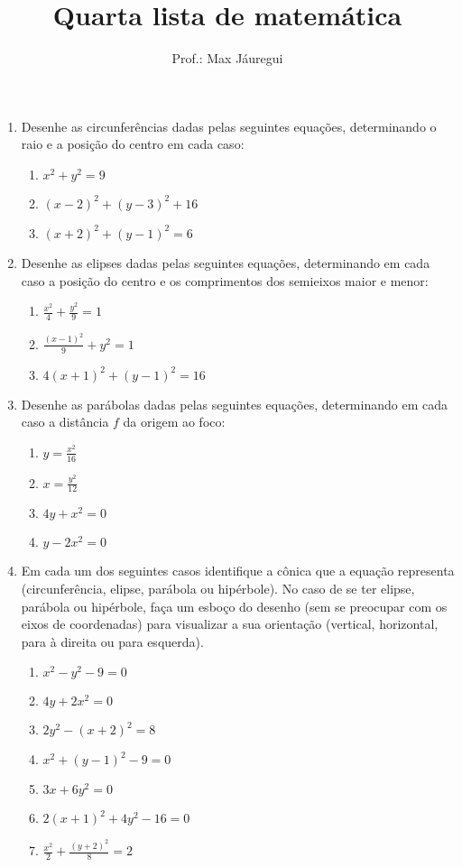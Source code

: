 \documentclass[10pt,a4paper]{article}
\title{Quarta lista de matemática}
\author{Prof.: Max Jáuregui}
\date{}
\newcommand{\ds}{\displaystyle}
\begin{document}
\maketitle
\begin{enumerate}
  \item Desenhe as circunferências dadas pelas seguintes equações, determinando o raio e a posição do centro em cada caso:
  \begin{enumerate}
  	\item $x^2+y^2=9$
  	\item $(x-2)^2+(y-3)^2+16$
  	\item $(x+2)^2+(y-1)^2=6$
  \end{enumerate}
\item Desenhe as elipses dadas pelas seguintes equações, determinando em cada caso a posição do centro e os comprimentos dos semieixos maior e menor:
\begin{enumerate}
	\item $\ds \frac{x^2}{4}+\frac{y^2}{9}=1$
	\item $\ds \frac{(x-1)^2}{9}+y^2=1$
	\item $4(x+1)^2+(y-1)^2=16$
\end{enumerate}
\item Desenhe as parábolas dadas pelas seguintes equações, determinando em cada caso a distância $f$ da origem ao foco:
\begin{enumerate}
	\item $\ds y=\frac{x^2}{16}$
	\item $\ds x=\frac{y^2}{12}$
	\item $\ds 4y+x^2=0$
	\item $\ds y-2x^2=0$
\end{enumerate}
\item Em cada um dos seguintes casos identifique a cônica que a equação representa (circunferência, elipse, parábola ou hipérbole). No caso de se ter elipse, parábola ou hipérbole, faça um esboço do desenho (sem se preocupar com os eixos de coordenadas) para visualizar a sua orientação (vertical, horizontal, para à direita ou para esquerda).
\begin{enumerate}
	\item $x^2-y^2-9=0$
	\item $4y+2x^2=0$
	\item $2y^2-(x+2)^2=8$
	\item $x^2+(y-1)^2-9=0$
	\item $3x+6y^2=0$
	\item $2(x+1)^2+4y^2-16=0$
	\item $\ds \frac{x^2}{2}+\frac{(y+2)^2}{8}=2$
\end{enumerate}
\end{enumerate}
\end{document}
